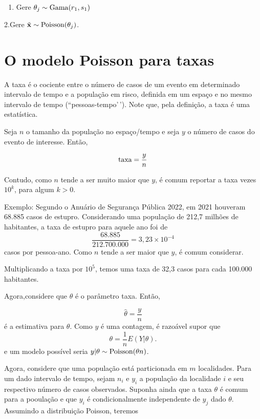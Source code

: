 \documentclass[
  letterpaper,
  DIV=11,
  numbers=noendperiod]{scrreprt}
\providecommand{\tightlist}{%
  \setlength{\itemsep}{0pt}\setlength{\parskip}{0pt}}\usepackage{longtable,booktabs,array}
\theoremstyle{definition}
\theoremstyle{definition}
\theoremstyle{plain}
\theoremstyle{remark}
\begin{document}
\begin{enumerate}
\def\labelenumi{\arabic{enumi}.}
\tightlist
\item
  Gere \(\theta_j\sim\hbox{Gama}(r_1,s_1)\)
\end{enumerate}

2.Gere \(\tilde{\mathbf{x}}\sim\hbox{Poisson}(\theta_j)\).

\section{O modelo Poisson para taxas}\label{o-modelo-poisson-para-taxas}

A taxa é o cociente entre o número de casos de um evento em determinado
intervalo de tempo e a população em risco, definida em um espaço e no
mesmo intervalo de tempo (``pessoas-tempo'\,'). Note que, pela
definição, a taxa é uma estatística.

Seja \(n\) o tamanho da população no espaço/tempo e seja \(y\) o número
de casos do evento de interesse. Então,

\[\hbox{taxa} = \frac{y}{n}\]

Contudo, como \(n\) tende a ser muito maior que \(y\), é comum reportar
a taxa vezes \(10^k\), para algum \(k>0\).

Exemplo: Segundo o Anuário de Segurança Pública 2022, em 2021 houveram
68.885 casos de estupro. Considerando uma população de 212,7 milhões de
habitantes, a taxa de estupro para aquele ano foi de
\[\frac{68.885}{212.700.000}=3,23\times 10^{-4}\] casos por pessoa-ano.
Como \(n\) tende a ser maior que \(y\), é comum considerar.

Multiplicando a taxa por \(10^5\), temos uma taxa de 32,3 casos para
cada 100.000 habitantes.

Agora,considere que \(\theta\) é o parâmetro taxa. Então,

\[\hat{\theta}=\frac{y}{n}\] é a estimativa para \(\theta\). Como \(y\)
é uma contagem, é razoável supor que \[\theta =\frac{1}{n}E(Y|\theta).\]
e um modelo possível seria \(y|\theta\sim\hbox{Poisson}(\theta n)\).

Agora, considere que uma população está particionada em \(m\)
localidades. Para um dado intervalo de tempo, sejam \(n_i\) e \(y_i\) a
população da localidade \(i\) e seu respectivo número de casos
observados. Suponha ainda que a taxa \(\theta\) é comum para a pooulação
e que \(y_i\) é condicionalmente independente de \(y_j\) dado
\(\theta\). Assumindo a distribuição Poisson, teremos
\end{document}
